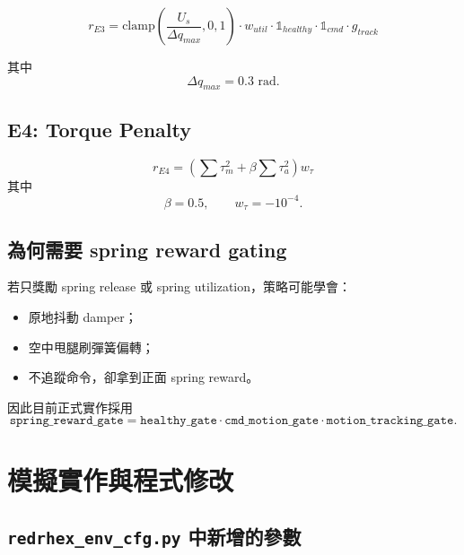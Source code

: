 \documentclass[12pt,a4paper,UTF8]{ctexart}
\begin{document}
\begin{equation}
r_{E3}
=
\mathrm{clamp}\left(
\frac{U_s}{\Delta q_{max}}, 0, 1
\right)
\cdot w_{util}
\cdot \mathbb{1}_{healthy}
\cdot \mathbb{1}_{cmd}
\cdot g_{track}
\end{equation}

其中
\begin{equation}
\Delta q_{max} = 0.3 \text{ rad}.
\end{equation}

\subsection{E4: Torque Penalty}

\begin{equation}
r_{E4}
=
\left(
\sum \tau_m^2 + \beta \sum \tau_a^2
\right) w_{\tau}
\end{equation}
其中
\begin{equation}
\beta = 0.5, \qquad w_{\tau} = -10^{-4}.
\end{equation}

\subsection{為何需要 spring reward gating}

若只獎勵 spring release 或 spring utilization，策略可能學會：
\begin{itemize}[leftmargin=2em]
    \item 原地抖動 damper；
    \item 空中甩腿刷彈簧偏轉；
    \item 不追蹤命令，卻拿到正面 spring reward。
\end{itemize}

因此目前正式實作採用
\begin{equation}
\texttt{spring\_reward\_gate}
=
\texttt{healthy\_gate}
\cdot
\texttt{cmd\_motion\_gate}
\cdot
\texttt{motion\_tracking\_gate}.
\end{equation}

\section{模擬實作與程式修改}

\subsection{\texttt{redrhex\_env\_cfg.py} 中新增的參數}
\end{document}
